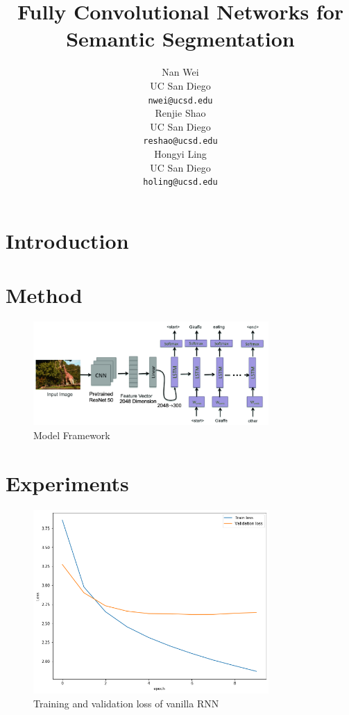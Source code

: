 \documentclass{article} %
\title{Fully Convolutional Networks for Semantic
Segmentation}
\author{
Nan Wei \\
UC San Diego\\
\texttt{nwei@ucsd.edu} \\
\And
Renjie Shao \\
UC San Diego \\
\texttt{reshao@ucsd.edu} \\
\And
Hongyi Ling \\
UC San Diego \\
\texttt{holing@ucsd.edu} \\
}
\begin{document}
\maketitle

\begin{abstract}

\end{abstract}

\section{Introduction}


\section{Method}

\begin{figure}[htb!]
    \centering
     \includegraphics[width=0.8\textwidth]{frame}
    \caption{Model Framework \cite{10.1007/978-3-030-04780-1_23}}
    \label{loss_fcn}
\end{figure}

\section{Experiments}

\begin{figure}[htb!]
    \centering
     \includegraphics[width=0.8\textwidth]{RNNloss}
    \caption{Training and validation loss of vanilla RNN}
    \label{loss_fcn}
\end{figure}
\end{document}
